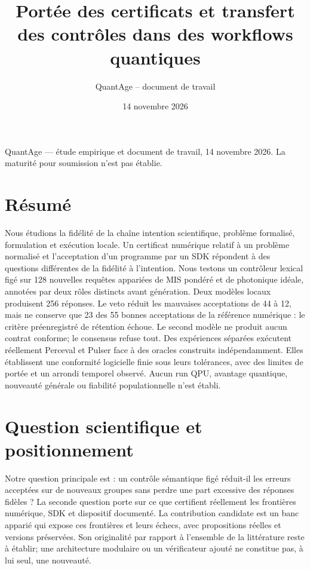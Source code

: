\documentclass[11pt]{article}
\title{Portée des certificats et transfert des contrôles dans des workflows quantiques}
\author{QuantAge -- document de travail}
\date{14 novembre 2026}
\begin{document}
\maketitle

QuantAge — étude empirique et document de travail, 14 novembre 2026. La maturité pour soumission n'est pas établie.

\section{Résumé}

Nous étudions la fidélité de la chaîne intention scientifique, problème formalisé, formulation et exécution locale. Un certificat numérique relatif à un problème normalisé et l'acceptation d'un programme par un SDK répondent à des questions différentes de la fidélité à l'intention. Nous testons un contrôleur lexical figé sur 128 nouvelles requêtes appariées de MIS pondéré et de photonique idéale, annotées par deux rôles distincts avant génération. Deux modèles locaux produisent 256 réponses. Le veto réduit les mauvaises acceptations de 44 à 12, mais ne conserve que 23 des 55 bonnes acceptations de la référence numérique : le critère préenregistré de rétention échoue. Le second modèle ne produit aucun contrat conforme; le consensus refuse tout. Des expériences séparées exécutent réellement Perceval et Pulser face à des oracles construits indépendamment. Elles établissent une conformité logicielle finie sous leurs tolérances, avec des limites de portée et un arrondi temporel observé. Aucun run QPU, avantage quantique, nouveauté générale ou fiabilité populationnelle n'est établi.

\section{Question scientifique et positionnement}

Notre question principale est : un contrôle sémantique figé réduit-il les erreurs acceptées sur de nouveaux groupes sans perdre une part excessive des réponses fidèles ? La seconde question porte sur ce que certifient réellement les frontières numérique, SDK et dispositif documenté. La contribution candidate est un banc apparié qui expose ces frontières et leurs échecs, avec propositions réelles et versions préservées. Son originalité par rapport à l'ensemble de la littérature reste à établir; une architecture modulaire ou un vérificateur ajouté ne constitue pas, à lui seul, une nouveauté.
\end{document}
